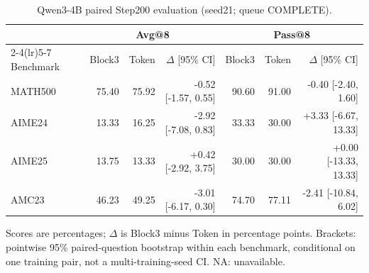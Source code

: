 \begin{table}[t]
\centering
\scriptsize
\setlength{\tabcolsep}{4pt}
\caption{Qwen3-4B paired Step200 evaluation (seed21; queue COMPLETE).}
\label{tab:qwen4endpoint}
\begin{tabular}{lrrrrrr}
\toprule
 & \multicolumn{3}{c}{Avg@8} & \multicolumn{3}{c}{Pass@8} \\
\cmidrule(lr){2-4}\cmidrule(lr){5-7}
Benchmark & Block3 & Token & $\Delta$ [95\% CI] & Block3 & Token & $\Delta$ [95\% CI] \\
\midrule
MATH500 & 75.40 & 75.92 & -0.52 [-1.57, 0.55] & 90.60 & 91.00 & -0.40 [-2.40, 1.60] \\
AIME24 & 13.33 & 16.25 & -2.92 [-7.08, 0.83] & 33.33 & 30.00 & +3.33 [-6.67, 13.33] \\
AIME25 & 13.75 & 13.33 & +0.42 [-2.92, 3.75] & 30.00 & 30.00 & +0.00 [-13.33, 13.33] \\
AMC23 & 46.23 & 49.25 & -3.01 [-6.17, 0.30] & 74.70 & 77.11 & -2.41 [-10.84, 6.02] \\
\bottomrule
\end{tabular}
\par\smallskip\footnotesize Scores are percentages; $\Delta$ is Block3 minus Token in percentage points. Brackets: pointwise 95\% paired-question bootstrap within each benchmark, conditional on one training pair, not a multi-training-seed CI. NA: unavailable.
\end{table}

